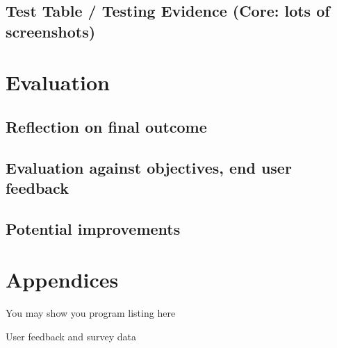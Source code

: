 \documentclass[titlepage]{article}
\begin{document}
\subsection{Test Table / Testing Evidence (Core: lots of screenshots)}

\section{Evaluation}

\subsection{Reflection on final outcome}

\subsection{Evaluation against objectives, end user feedback}

\subsection{Potential improvements}

\section{Appendices}

You may show you program listing here

User feedback and survey data
\end{document}
